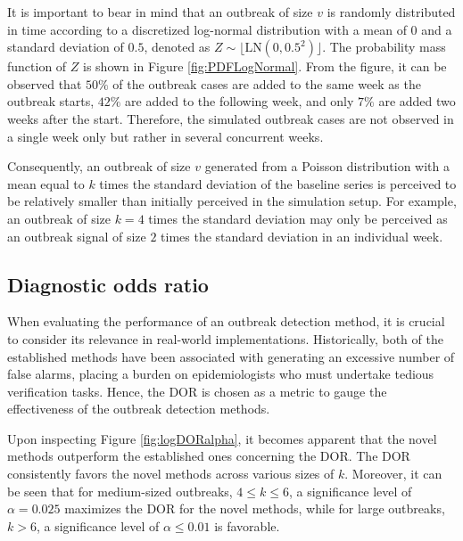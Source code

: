 \documentclass[preprint, 3p, authoryear]{elsarticle} %
\begin{document}
It is important to bear in mind that an outbreak of size \(v\) is randomly distributed in time according to a discretized log-normal distribution with a mean of \(0\) and a standard deviation of \(0.5\), denoted as \(Z \sim \lfloor \mathrm{LN}(0,0.5^2)\rfloor\). The probability mass function of \(Z\) is shown in Figure \ref{fig:PDFLogNormal}. From the figure, it can be observed that \(50\%\) of the outbreak cases are added to the same week as the outbreak starts, \(42\%\) are added to the following week, and only \(7\%\) are added two weeks after the start. Therefore, the simulated outbreak cases are not observed in a single week only but rather in several concurrent weeks.

Consequently, an outbreak of size \(v\) generated from a Poisson distribution with a mean equal to \(k\) times the standard deviation of the baseline series is perceived to be relatively smaller than initially perceived in the simulation setup. For example, an outbreak of size \(k=4\) times the standard deviation may only be perceived as an outbreak signal of size \(2\) times the standard deviation in an individual week.

\hypertarget{diagnostic-odds-ratio}{%
\subsection{Diagnostic odds ratio}\label{diagnostic-odds-ratio}}

When evaluating the performance of an outbreak detection method, it is crucial to consider its relevance in real-world implementations. Historically, both of the established methods have been associated with generating an excessive number of false alarms, placing a burden on epidemiologists who must undertake tedious verification tasks. Hence, the DOR is chosen as a metric to gauge the effectiveness of the outbreak detection methods.

Upon inspecting Figure \ref{fig:logDORalpha}, it becomes apparent that the novel methods outperform the established ones concerning the DOR. The DOR consistently favors the novel methods across various sizes of \(k\). Moreover, it can be seen that for medium-sized outbreaks, \(4\leq k \leq 6\), a significance level of \(\alpha=0.025\) maximizes the DOR for the novel methods, while for large outbreaks, \(k>6\), a significance level of \(\alpha\leq 0.01\) is favorable.
\end{document}
